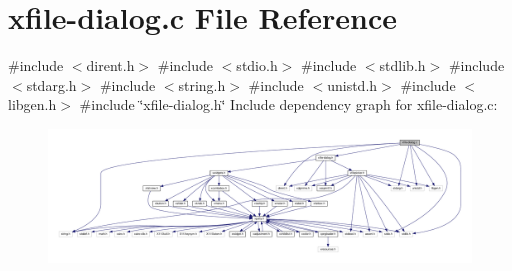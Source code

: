 \hypertarget{xfile-dialog_8c}{}\section{xfile-\/dialog.c File Reference}
\label{xfile-dialog_8c}
{\ttfamily \#include $<$dirent.\+h$>$}\newline
{\ttfamily \#include $<$stdio.\+h$>$}\newline
{\ttfamily \#include $<$stdlib.\+h$>$}\newline
{\ttfamily \#include $<$stdarg.\+h$>$}\newline
{\ttfamily \#include $<$string.\+h$>$}\newline
{\ttfamily \#include $<$unistd.\+h$>$}\newline
{\ttfamily \#include $<$libgen.\+h$>$}\newline
{\ttfamily \#include \char`\"{}xfile-\/dialog.\+h\char`\"{}}\newline
Include dependency graph for xfile-\/dialog.c\+:
\nopagebreak
\begin{figure}[H]
\begin{center}
\leavevmode
\includegraphics[width=350pt]{xfile-dialog_8c__incl}
\end{center}
\end{figure}
